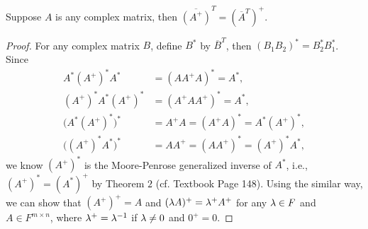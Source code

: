 \begin{pro}%
	Suppose $A$ is any complex matrix, then $\overline{(A^+)}^T=(\overline{A}^T)^+$.
\end{pro}
\begin{proof}
	For any complex matrix $B$, define $B^*$ by $\overline{B}^T$, then $(B_1B_2)^*=B_2^* B_1^*$. Since
	\begin{align*}
		A^*(A^+)^*A^*&=(AA^+A)^*=A^*,\\
		(A^+)^*A^*(A^+)^*&=(A^+AA^+)^*=A^*,\\
		\big(A^*(A^+)^*\big)^*&=A^+A=(A^+A)^*=A^*(A^+)^*,\\
		\big((A^+)^*A^*\big)^*&=AA^+=(AA^+)^*=(A^+)^*A^*,
	\end{align*}
	we know $(A^+)^*$ is the Moore-Penrose generalized inverse of $A^*$, i.e., $(A^+)^*=(A^*)^+$ by Theorem $2$ (cf. Textbook Page 148). Using the similar way, we can show that $(A^+)^+=A$ and $(\lambda A)^+=\lambda^+ A^+$ for any $\lambda\in F$ and $A\in F^{m\times n}$, where $\lambda^+=\lambda^{-1}$ if $\lambda\neq 0$ and $0^+=0$.
\end{proof}